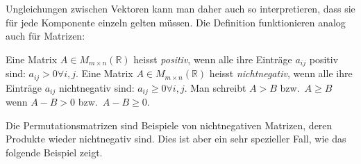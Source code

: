 Ungleichungen zwischen Vektoren kann man daher auch so interpretieren,
dass sie für jede Komponente einzeln gelten müssen.
Die Definition funktionieren analog auch für Matrizen:

\begin{definition}
Eine Matrix $A\in M_{m\times n}(\mathbb{R})$  heisst {\em positiv},
wenn alle ihre Einträge $a_{ij}$ positiv sind: $a_{ij}>0\forall i,j$.
Eine Matrix $A\in M_{m\times n}(\mathbb{R})$  heisst {\em nichtnegativ},
wenn alle ihre Einträge $a_{ij}$ nichtnegativ sind: $a_{ij}\ge 0\forall i,j$.
%
%
Man schreibt $A>B$ bzw.~$A\ge B$ wenn $A-B>0$ bzw.~$A-B\ge 0$.
\end{definition}

Die Permutationsmatrizen sind Beispiele von nichtnegativen Matrizen,
deren Produkte wieder nichtnegativ sind.
Dies ist aber ein sehr spezieller Fall, wie das folgende Beispiel
zeigt.

